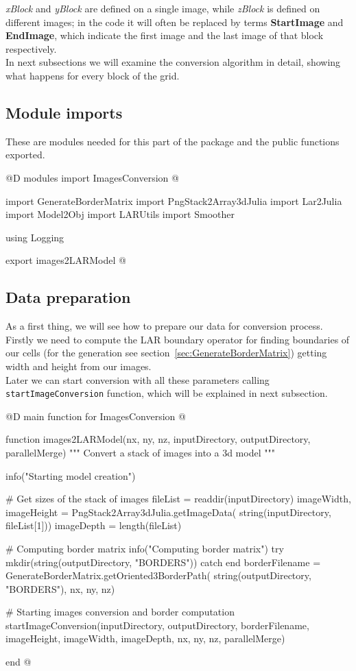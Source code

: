 \documentclass[11pt,oneside]{article}	%
\begin{document}
\textit{xBlock} and \textit{yBlock} are defined on a single image, while \textit{zBlock} is defined on different images; in the code it will often be replaced by terms \textbf{StartImage} and \textbf{EndImage}, which indicate the first image and the last image of that block respectively.\\

In next subsections we will examine the conversion algorithm in detail, showing what happens for every block of the grid.

\subsection{Module imports}\label{sec:ImagesConversionImports}
These are modules needed for this part of the package and the public functions exported.

@D modules import ImagesConversion
@{import GenerateBorderMatrix
import PngStack2Array3dJulia
import Lar2Julia
import Model2Obj
import LARUtils
import Smoother

using Logging

export images2LARModel
@}

\subsection{Data preparation}\label{sec:ImagesConversionDataPreparation}
As a first thing, we will see how to prepare our data for conversion process. Firstly we need to compute the LAR boundary operator for finding boundaries of our cells (for the generation see section~\ref{sec:GenerateBorderMatrix}) getting width and height from our images.\\
Later we can start conversion with all these parameters calling \texttt{startImageConversion} function, which will be explained in next subsection.

@D main function for ImagesConversion
@{function images2LARModel(nx, ny, nz,
                         inputDirectory, outputDirectory,
                         parallelMerge)
  """
  Convert a stack of images into a 3d model
  """

  info("Starting model creation")

  # Get sizes of the stack of images
  fileList = readdir(inputDirectory)
  imageWidth, imageHeight = PngStack2Array3dJulia.getImageData(
    string(inputDirectory, fileList[1]))
  imageDepth = length(fileList)

  # Computing border matrix
  info("Computing border matrix")
  try
    mkdir(string(outputDirectory, "BORDERS"))
  catch
  end
  borderFilename = GenerateBorderMatrix.getOriented3BorderPath(
    string(outputDirectory, "BORDERS"), nx, ny, nz)

  # Starting images conversion and border computation
  startImageConversion(inputDirectory, outputDirectory, borderFilename,
                       imageHeight, imageWidth, imageDepth,
                       nx, ny, nz,
                       parallelMerge)

end
@}
\end{document}
